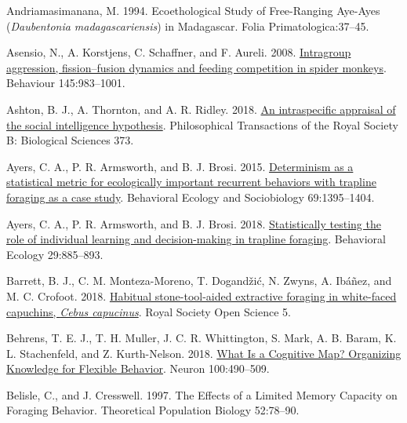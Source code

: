 \documentclass[twoside,12pt,final]{ucthesis-CA2012}
\newenvironment{CSLReferences}%
  {}%
  {\par}
\begin{document}
\begin{ucmainmatter}
\begin{CSLReferences}{1}{0}
\leavevmode{}%
Andriamasimanana, M. 1994. Ecoethological Study of Free-Ranging Aye-Ayes (\emph{Daubentonia madagascariensis}) in Madagascar. Folia Primatologica:37--45.

\leavevmode{}%
Asensio, N., A. Korstjens, C. Schaffner, and F. Aureli. 2008. \href{https://doi.org/10.1163/156853908784089234}{Intragroup aggression, fission--fusion dynamics and feeding competition in spider monkeys}. Behaviour 145:983--1001.

\leavevmode{}%
Ashton, B. J., A. Thornton, and A. R. Ridley. 2018. \href{https://doi.org/10.1098/rstb.2017.0288}{An intraspecific appraisal of the social intelligence hypothesis}. Philosophical Transactions of the Royal Society B: Biological Sciences 373.

\leavevmode{}%
Ayers, C. A., P. R. Armsworth, and B. J. Brosi. 2015. \href{https://doi.org/10.1007/s00265-015-1948-3}{Determinism as a statistical metric for ecologically important recurrent behaviors with trapline foraging as a case study}. Behavioral Ecology and Sociobiology 69:1395--1404.

\leavevmode{}%
Ayers, C. A., P. R. Armsworth, and B. J. Brosi. 2018. \href{https://doi.org/10.1093/beheco/ary058}{Statistically testing the role of individual learning and decision-making in trapline foraging}. Behavioral Ecology 29:885--893.

\leavevmode{}%
Barrett, B. J., C. M. Monteza-Moreno, T. Dogandžić, N. Zwyns, A. Ibáñez, and M. C. Crofoot. 2018. \href{https://doi.org/10.1098/rsos.181002}{Habitual stone-tool-aided extractive foraging in white-faced capuchins, \emph{Cebus capucinus}}. Royal Society Open Science 5.

\leavevmode{}%
Behrens, T. E. J., T. H. Muller, J. C. R. Whittington, S. Mark, A. B. Baram, K. L. Stachenfeld, and Z. Kurth-Nelson. 2018. \href{https://doi.org/10.1016/j.neuron.2018.10.002}{What Is a Cognitive Map? Organizing Knowledge for Flexible Behavior}. Neuron 100:490--509.

\leavevmode{}%
Belisle, C., and J. Cresswell. 1997. The Effects of a Limited Memory Capacity on Foraging Behavior. Theoretical Population Biology 52:78--90.


\end{CSLReferences}
\end{ucmainmatter}
\end{document}

